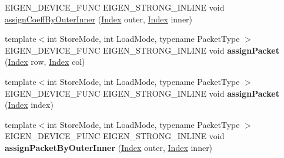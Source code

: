 \begin{DoxyCompactItemize}
\item 
E\+I\+G\+E\+N\+\_\+\+D\+E\+V\+I\+C\+E\+\_\+\+F\+U\+NC E\+I\+G\+E\+N\+\_\+\+S\+T\+R\+O\+N\+G\+\_\+\+I\+N\+L\+I\+NE void \hyperlink{class_eigen_1_1internal_1_1generic__dense__assignment__kernel_aff1bc113e270d4f895ca90570536303b}{assign\+Coeff\+By\+Outer\+Inner} (\hyperlink{namespace_eigen_a62e77e0933482dafde8fe197d9a2cfde}{Index} outer, \hyperlink{namespace_eigen_a62e77e0933482dafde8fe197d9a2cfde}{Index} inner)
\item 
\mbox{\label{class_eigen_1_1internal_1_1generic__dense__assignment__kernel_aaed04d17fc441168ff9d7dfbda9f7c6e}} 
{\footnotesize template$<$int Store\+Mode, int Load\+Mode, typename Packet\+Type $>$ }\\E\+I\+G\+E\+N\+\_\+\+D\+E\+V\+I\+C\+E\+\_\+\+F\+U\+NC E\+I\+G\+E\+N\+\_\+\+S\+T\+R\+O\+N\+G\+\_\+\+I\+N\+L\+I\+NE void {\bfseries assign\+Packet} (\hyperlink{namespace_eigen_a62e77e0933482dafde8fe197d9a2cfde}{Index} row, \hyperlink{namespace_eigen_a62e77e0933482dafde8fe197d9a2cfde}{Index} col)
\item 
\mbox{\label{class_eigen_1_1internal_1_1generic__dense__assignment__kernel_a152c4bd979ed06358343fa77edc037a7}} 
{\footnotesize template$<$int Store\+Mode, int Load\+Mode, typename Packet\+Type $>$ }\\E\+I\+G\+E\+N\+\_\+\+D\+E\+V\+I\+C\+E\+\_\+\+F\+U\+NC E\+I\+G\+E\+N\+\_\+\+S\+T\+R\+O\+N\+G\+\_\+\+I\+N\+L\+I\+NE void {\bfseries assign\+Packet} (\hyperlink{namespace_eigen_a62e77e0933482dafde8fe197d9a2cfde}{Index} index)
\item 
\mbox{\label{class_eigen_1_1internal_1_1generic__dense__assignment__kernel_a91436c094fad327d8128825e2c8a54cc}} 
{\footnotesize template$<$int Store\+Mode, int Load\+Mode, typename Packet\+Type $>$ }\\E\+I\+G\+E\+N\+\_\+\+D\+E\+V\+I\+C\+E\+\_\+\+F\+U\+NC E\+I\+G\+E\+N\+\_\+\+S\+T\+R\+O\+N\+G\+\_\+\+I\+N\+L\+I\+NE void {\bfseries assign\+Packet\+By\+Outer\+Inner} (\hyperlink{namespace_eigen_a62e77e0933482dafde8fe197d9a2cfde}{Index} outer, \hyperlink{namespace_eigen_a62e77e0933482dafde8fe197d9a2cfde}{Index} inner)
\item 
\mbox{\label{class_eigen_1_1internal_1_1generic__dense__assignment__kernel_a0f15e70d3ced7871f0c9d9b701e7f934}} 

\end{DoxyCompactItemize}
